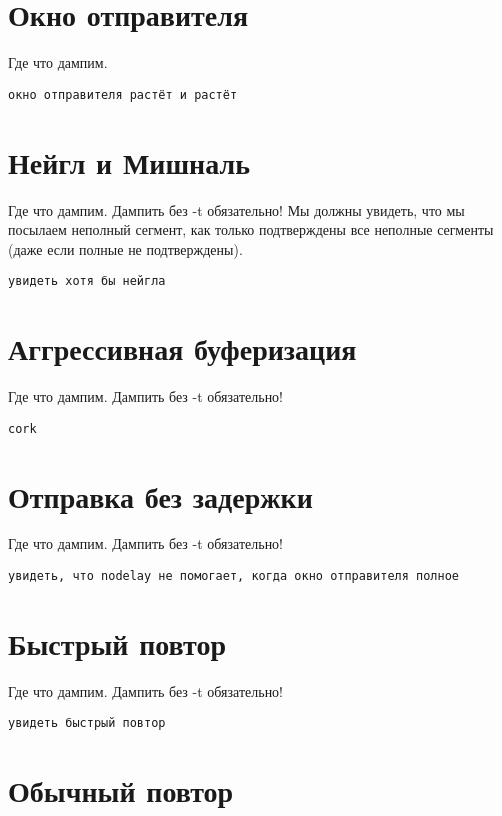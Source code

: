\documentclass[a4paper,12pt]{article}
\begin{document}
\section{Окно отправителя}

Где что дампим.

\begin{Verbatim}
окно отправителя растёт и растёт
\end{Verbatim}

\section{Нейгл и Мишналь}

Где что дампим.  Дампить без -t обязательно!
Мы должны увидеть, что мы посылаем неполный сегмент, как только подтверждены все неполные сегменты (даже если полные не подтверждены).

\begin{Verbatim}
увидеть хотя бы нейгла
\end{Verbatim}

\section{Аггрессивная буферизация}

Где что дампим.  Дампить без -t обязательно!

\begin{Verbatim}
cork
\end{Verbatim}

\section{Отправка без задержки}

Где что дампим.  Дампить без -t обязательно!

\begin{Verbatim}
увидеть, что nodelay не помогает, когда окно отправителя полное
\end{Verbatim}

\section{Быстрый повтор}

Где что дампим.  Дампить без -t обязательно!

\begin{Verbatim}
увидеть быстрый повтор
\end{Verbatim}

\section{Обычный повтор}
\end{document}
